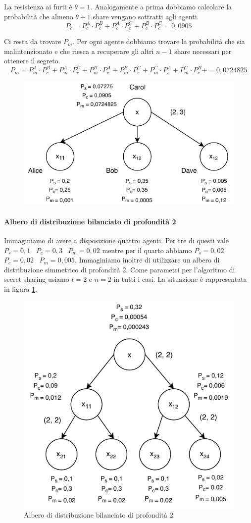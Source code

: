 La resistenza ai furti è $ \theta = 1 $. Analogamente a prima dobbiamo calcolare la probabilità che
almeno $ \theta + 1 $ share vengano sottratti agli agenti.
$$ P_c = P_c^A \cdot P_c^B + P_c^A \cdot P_c^C + P_c^B \cdot P_c^C = 0,0905 $$

Ci resta da trovare $ P_m $. Per ogni agente dobbiamo trovare la probabilità che sia malintenzionato e che riesca
a recuperare gli altri $ n - 1 $ share necessari per ottenere il segreto.
$$ P_m =
	P_m^A \cdot P_c^B + P_m^A \cdot P_c^C +
	P_m^B \cdot P_c^A + P_m^B \cdot P_c^C +
	P_m^C \cdot P_c^A + P_m^C \cdot P_c^B +
	= 0,0724825 $$

\begin{figure}[H]
	\centering
	\includegraphics[width=0.6\linewidth]{images/chap_analisi_robustezza/robustezza-1.pdf}
\end{figure}

\paragraph{Albero di distribuzione bilanciato di profondità 2}
Immaginiamo di avere a disposizione quattro agenti. Per tre di questi
vale
$ P_s = 0,1 $ \,
$ P_c = 0,3 $ \,
$ P_m = 0,02 $
mentre per il quarto abbiamo
$ P_s = 0,02 $ \,
$ P_c = 0,02 $ \,
$ P_m = 0,005 $.
Immaginiamo inoltre di utilizzare un albero di distribuzione simmetrico di profondità 2.
Come parametri per l'algoritmo di secret sharing usiamo $ t = 2 $ e $ n = 2 $ in tutti i casi.
La situazione è rappresentata in figura \ref{fig:robustezza-2-1}.

\begin{figure}[H]
	\centering
	\includegraphics[width=0.6\linewidth]{images/chap_analisi_robustezza/robustezza-2-1.pdf}
	\caption{Albero di distribuzione bilanciato di profondità 2}
	\label{fig:robustezza-2-1}
\end{figure}

